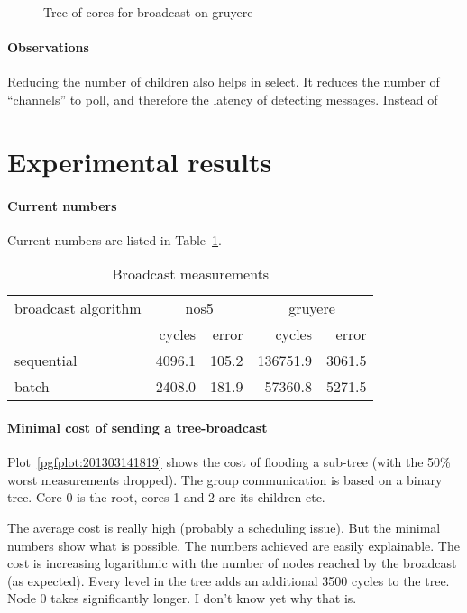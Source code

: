 \documentclass{article}
\begin{document}
\begin{figure}
  
  \caption{Tree of cores for broadcast on gruyere}
  \label{fig:qrm_tree_gruyere}
\end{figure}

\paragraph{Observations} Reducing the number of children also helps in
select. It reduces the number of ``channels'' to poll, and therefore
the latency of detecting messages. Instead of

\section{Experimental results}

\paragraph{Current numbers} Current numbers are listed in
Table~\ref{tab:bc_measurements}. 

\begin{table}[htb]
  \centering
  \begin{tabular}{lrrrr}
    \toprule
    broadcast algorithm & \multicolumn{2}{c}{nos5} & \multicolumn{2}{c}{gruyere} \\
      & cycles & error & cycles & error \\
    \midrule
    sequential &  4096.1 &  105.2 & 136751.9 &   3061.5 \\
    batch      &  2408.0 &  181.9 &  57360.8 &   5271.5 \\
    \bottomrule
  \end{tabular}
  \caption{Broadcast measurements}
  \label{tab:bc_measurements}
\end{table}

\paragraph{Minimal cost of sending a tree-broadcast} %
Plot~\ref{pgfplot:201303141819} shows the cost of flooding a sub-tree
(with the 50\% worst measurements dropped). The group communication is
based on a binary tree. Core 0 is the root, cores 1 and 2 are its
children etc.

The average cost is really high (probably a scheduling issue). But the
minimal numbers show what is possible. The numbers achieved are easily
explainable. The cost is increasing logarithmic with the number of
nodes reached by the broadcast (as expected). Every level in the tree
adds an additional 3500 cycles to the tree. Node 0 takes significantly
longer. I don't know yet why that is.
\end{document}
